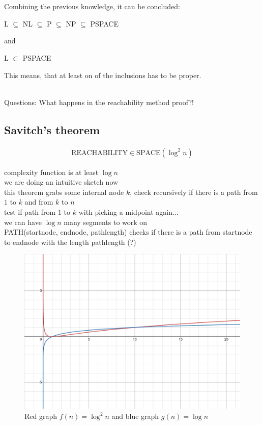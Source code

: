\documentclass[a4]{scrartcl}
\begin{document}
\ \\ \\
Combining the previous knowledge, it can be concluded:
\begin{center}
L $\subseteq$ NL $\subseteq$ P $\subseteq$ NP $\subseteq$ PSPACE
\end{center}
and
\begin{center}
L $\subset$ PSPACE
\end{center}
This means, that at least on of the inclusions has to be proper.

\ \\
\color{violet} Questions: What happens in the reachability method proof?!
\color{black}





\subsection*{Savitch's theorem}
\begin{align*}
\text{REACHABILITY} \in \text{SPACE}(\log^2 n)
\end{align*}

complexity function is at least $\log n$ \\
we are doing an intuitive sketch now \\
this theorem grabs some internal node $k$, check recursively if there is a path from $1$ to $k$ and from $k$ to $n$ \\
test if path from $1$ to $k$ with picking a midpoint again... \\
we can have $\log n$ many segments to work on \\
PATH(startnode, endnode, pathlength) checks if there is a path from startnode to endnode with the length pathlength (?) \\


\begin{figure}[H]
\begin{center}
\includegraphics[scale=0.3]{images/logplot.png}
\caption{Red graph $f(n) = \log ^2 n$ and blue graph $g(n)= \log n$}
\end{center}
\end{figure}
\end{document}
